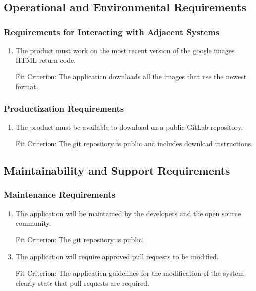 \documentclass[12pt, titlepage]{article}
\begin{document}
\subsection{Operational and Environmental Requirements}

\subsubsection{Requirements for Interacting with Adjacent Systems}

\begin{enumerate}[label=IAR\arabic*:, wide=0pt, leftmargin=*]
    \item The product must work on the most recent version of the google images HTML return code.
    \item [Fit Criterion:] The application downloads all the images that use the newest format.
\end{enumerate}

\subsubsection{Productization Requirements}
\begin{enumerate}[label=PDR\arabic*:, wide=0pt, leftmargin=*]
    \item The product must be available to download on a public GitLab repository.
    \item [Fit Criterion:] The git repository is public and includes download instructions.
\end{enumerate}


\subsection{Maintainability and Support Requirements}

\subsubsection{Maintenance Requirements}
\begin{enumerate}[label=MSR\arabic*:, wide=0pt, leftmargin=*]
    \item The application will be maintained by the developers and the open source community.
    \item [Fit Criterion:] The git repository is public.
    \\
    \item The application will require approved pull requests to be modified.
    \item [Fit Criterion:] The application guidelines for the modification of the system clearly state that pull requests are required.
\end{enumerate}
\end{document}
